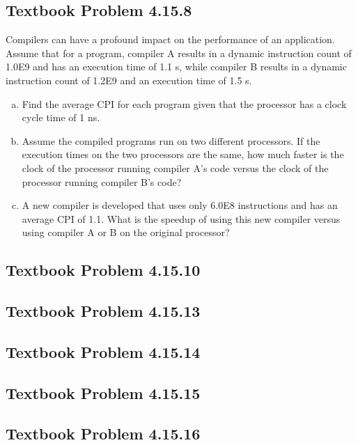 \documentclass[12pt]{article}
\begin{document}
\subsection{Textbook Problem 4.15.8}
Compilers can have a profound impact on the performance of an application. Assume that for a program, compiler A results in a dynamic instruction count of 1.0E9 and has an execution time of 1.1 s, while compiler B results in a dynamic instruction count of 1.2E9 and an execution time of 1.5 s.

\begin{enumerate}[(a)]
    \item Find the average CPI for each program given that the processor has a clock cycle time of 1 ns.
    \item Assume the compiled programs run on two different processors. If the execution times on the two processors are the same, how much faster is the clock of the processor running compiler A's code versus the clock of the processor running compiler B's code?
    \item A new compiler is developed that uses only 6.0E8 instructions and has an average CPI of 1.1. What is the speedup of using this new compiler versus using compiler A or B on the original processor?


\end{enumerate}



\subsection{Textbook Problem 4.15.10}
\subsection{Textbook Problem 4.15.13}
\subsection{Textbook Problem 4.15.14}
\subsection{Textbook Problem 4.15.15}
\subsection{Textbook Problem 4.15.16}
\end{document}
